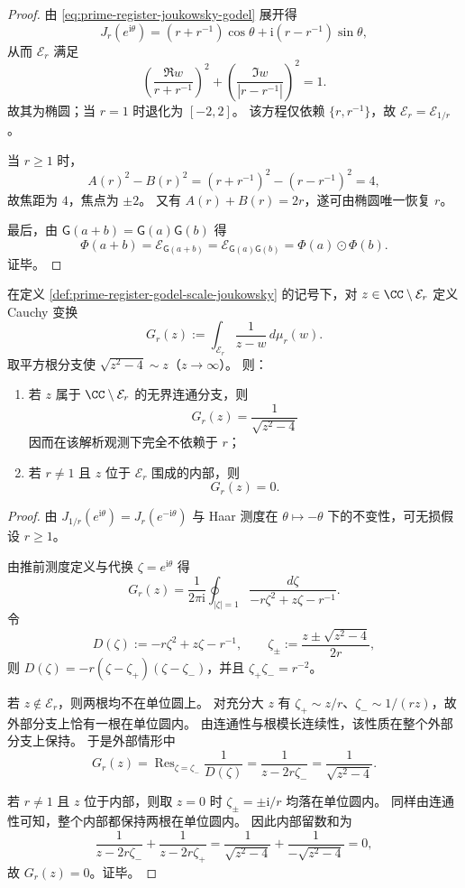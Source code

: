 \begin{proof}
由 \eqref{eq:prime-register-joukowsky-godel} 展开得
\[
J_r(e^{\mathrm{i}\theta})
=(r+r^{-1})\cos\theta+\mathrm{i}(r-r^{-1})\sin\theta,
\]
从而 \(\mathcal E_r\) 满足
\[
\left(\frac{\Re w}{r+r^{-1}}\right)^2+\left(\frac{\Im w}{|r-r^{-1}|}\right)^2=1.
\]
故其为椭圆；当 \(r=1\) 时退化为 \([-2,2]\)。
该方程仅依赖 \(\{r,r^{-1}\}\)，故 \(\mathcal E_r=\mathcal E_{1/r}\)。

当 \(r\ge1\) 时，
\[
A(r)^2-B(r)^2=(r+r^{-1})^2-(r-r^{-1})^2=4,
\]
故焦距为 \(4\)，焦点为 \(\pm2\)。
又有 \(A(r)+B(r)=2r\)，遂可由椭圆唯一恢复 \(r\)。

最后，由 \(\mathsf G(a+b)=\mathsf G(a)\mathsf G(b)\) 得
\[
\Phi(a+b)=\mathcal E_{\mathsf G(a+b)}
=\mathcal E_{\mathsf G(a)\mathsf G(b)}
=\Phi(a)\odot \Phi(b).
\]
证毕。
\end{proof}

\begin{theorem}\label{thm:prime-register-joukowsky-cauchy-rigidity}
在定义 \ref{def:prime-register-godel-scale-joukowsky} 的记号下，对 \(z\in\CC\setminus\mathcal E_r\) 定义 Cauchy 变换
\[
G_r(z):=\int_{\mathcal E_r}\frac{1}{z-w}\,d\mu_r(w).
\]
取平方根分支使 \(\sqrt{z^2-4}\sim z\)（\(z\to\infty\)）。
则：
\begin{enumerate}
  \item 若 \(z\) 属于 \(\CC\setminus\mathcal E_r\) 的无界连通分支，则
  \[
  \boxed{\;G_r(z)=\frac{1}{\sqrt{z^2-4}}\;}
  \]
  因而在该解析观测下完全不依赖于 \(r\)；
  \item 若 \(r\ne1\) 且 \(z\) 位于 \(\mathcal E_r\) 围成的内部，则
  \[
  \boxed{\;G_r(z)=0.\;}
  \]
\end{enumerate}
\end{theorem}

\begin{proof}
由 \(J_{1/r}(e^{\mathrm{i}\theta})=J_r(e^{-\mathrm{i}\theta})\) 与 Haar 测度在 \(\theta\mapsto-\theta\) 下的不变性，可无损假设 \(r\ge1\)。

由推前测度定义与代换 \(\zeta=e^{\mathrm{i}\theta}\) 得
\[
G_r(z)=\frac{1}{2\pi\mathrm{i}}\oint_{|\zeta|=1}\frac{d\zeta}{-r\zeta^2+z\zeta-r^{-1}}.
\]
令
\[
D(\zeta):=-r\zeta^2+z\zeta-r^{-1},
\qquad
\zeta_{\pm}:=\frac{z\pm\sqrt{z^2-4}}{2r},
\]
则 \(D(\zeta)=-r(\zeta-\zeta_+)(\zeta-\zeta_-)\)，并且 \(\zeta_+\zeta_-=r^{-2}\)。

若 \(z\notin\mathcal E_r\)，则两根均不在单位圆上。
对充分大 \(z\) 有 \(\zeta_+\sim z/r\)、\(\zeta_-\sim 1/(rz)\)，故外部分支上恰有一根在单位圆内。
由连通性与根模长连续性，该性质在整个外部分支上保持。
于是外部情形中
\[
G_r(z)=\operatorname{Res}_{\zeta=\zeta_-}\frac{1}{D(\zeta)}
=\frac{1}{z-2r\zeta_-}
=\frac{1}{\sqrt{z^2-4}}.
\]

若 \(r\ne1\) 且 \(z\) 位于内部，则取 \(z=0\) 时 \(\zeta_\pm=\pm \mathrm{i}/r\) 均落在单位圆内。
同样由连通性可知，整个内部都保持两根在单位圆内。
因此内部留数和为
\[
\frac{1}{z-2r\zeta_-}+\frac{1}{z-2r\zeta_+}
=\frac{1}{\sqrt{z^2-4}}+\frac{1}{-\sqrt{z^2-4}}
=0,
\]
故 \(G_r(z)=0\)。证毕。
\end{proof}

